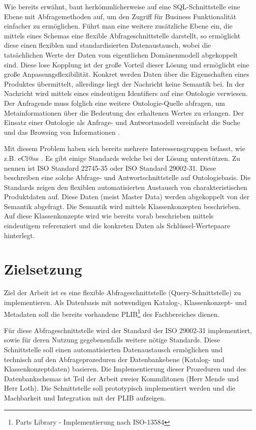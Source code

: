 Wie bereits erwähnt, baut herkömmlicherweise auf eine SQL-Schnittstelle eine Ebene mit Abfragemethoden auf, um den Zugriff für Business Funktionalität einfacher zu ermöglichen. Führt man eine weitere zusätzliche Ebene ein, die mittels eines Schemas eine flexible \gls{Abfrageschnittstelle} darstellt, so ermöglicht diese einen flexiblen und standardisierten Datenaustausch, wobei die tatsächlichen Werte der Daten vom eigentlichen Domänenmodell abgekoppelt sind. Diese lose Kopplung ist der große Vorteil dieser Lösung und ermöglicht eine große Anpassungsflexibilität. Konkret werden Daten über die Eigenschaften eines Produktes übermittelt, allerdings liegt der Nachricht keine Semantik bei. In der Nachricht wird mittels eines eindeutigen Identifiers auf eine \gls{Ontologie} verwiesen. Der Anfragende muss folglich eine weitere \gls{Ontologie}-Quelle abfragen, um Metainformationen über die Bedeutung des erhaltenen Wertes zu erlangen. 
Der Einsatz einer \gls{Ontologie} als Anfrage- und Antwortmodell vereinfacht die Suche und das Browsing von Informationen \citep[vgl.][S. 24f]{Hemmje}.

Mit diesem Problem haben sich bereits mehrere Interessensgruppen befasst, wie z.B. eCl@ss \citep[vgl.][]{uiterwykEclass}. Es gibt einige Standards welche bei der Lösung unterstützen. Zu nennen ist ISO Standard 22745-35 oder ISO Standard 29002-31. Diese beschreiben eine solche Abfrage- und Antwortschnittstelle auf Ontologiebasis. Die Standards zeigen den flexiblen automatisierten Austausch von charakteristischen Produktdaten auf. Diese Daten (meist Master Data) werden abgekoppelt von der Semantik abgefragt. Die Semantik wird mittels Klassenkonzepten beschrieben. Auf diese Klassenkonzepte wird wie bereits vorab beschrieben mittels eindeutigem  referenziert und die konkreten Daten als Schlüssel-Wertepaare hinterlegt.   

\section{Zielsetzung}

Ziel der Arbeit ist es eine flexible \gls{Abfrageschnittstelle} (Query-Schnittstelle) zu implementieren. Als Datenbasis mit notwendigen Katalog-, Klassenkonzept- und Metadaten soll die bereits vorhandene PLIB\footnote{Parts Library - Implementierung nach ISO-13584} des Fachbereiches dienen. 

Für diese \gls{Abfrageschnittstelle} wird der Standard der ISO 29002-31 implementiert, sowie für deren Nutzung gegebenenfalls weitere nötige Standards. Diese Schnittstelle soll einen automatisierten Datenaustausch ermöglichen und technisch auf den Abfrageprozeduren der Datenbankebene (Katalog- und Klassenkonzeptdaten) basieren. Die Implementierung dieser Prozeduren und des Datenbankschemas ist Teil der Arbeit zweier Kommilitonen (Herr Mende und Herr Loth). Die Schnittstelle soll prototypisch implementiert werden und die Machbarkeit und Integration mit der \gls{PLIB} aufzeigen. 

